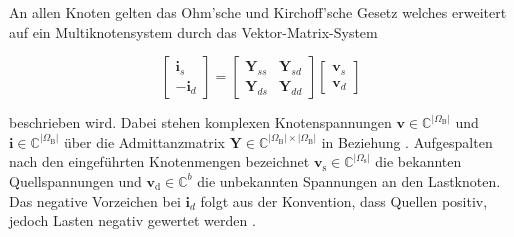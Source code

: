 An allen Knoten gelten das Ohm'sche und Kirchoff'sche Gesetz welches erweitert auf ein Multiknotensystem durch das Vektor-Matrix-System

%
\begin{equation}
	\label{eq:admittance_block}
	\begin{bmatrix} \mathbf{i}_s \\ -\mathbf{i}_d \end{bmatrix}
	=
	\begin{bmatrix} \mathbf{Y}_{ss} & \mathbf{Y}_{sd} \\ \mathbf{Y}_{ds} & \mathbf{Y}_{dd} \end{bmatrix}
	\begin{bmatrix} \mathbf{v}_s \\ \mathbf{v}_d \end{bmatrix}
\end{equation}

beschrieben wird. 
Dabei stehen komplexen Knotenspannungen $\mathbf{v} \in \mathbb{C}^{|\Omega_\mathrm{B}|}$ und $\mathbf{i} \in \mathbb{C}^{|\Omega_\mathrm{B}|}$ über die Admittanzmatrix $\mathbf{Y} \in \mathbb{C}^{|\Omega_\mathrm{B}| \times |\Omega_\mathrm{B}|}$ in Beziehung \cite{TinneyHart1967, Stott1974, Bernstein2018, Chen1991}.  
Aufgespalten nach den eingeführten Knotenmengen bezeichnet $\mathbf{v}_\mathrm{s} \in \mathbb{C}^{|\Omega_\mathrm{s}|}$ die bekannten Quellspannungen und $\mathbf{v}_\mathrm{d} \in \mathbb{C}^{b}$ die unbekannten Spannungen an den Lastknoten. Das negative Vorzeichen bei $\mathbf{i}_d$ folgt aus der Konvention, dass Quellen positiv, jedoch Lasten negativ gewertet werden \cite{Kersting2017, Milano2010}. \\ 

